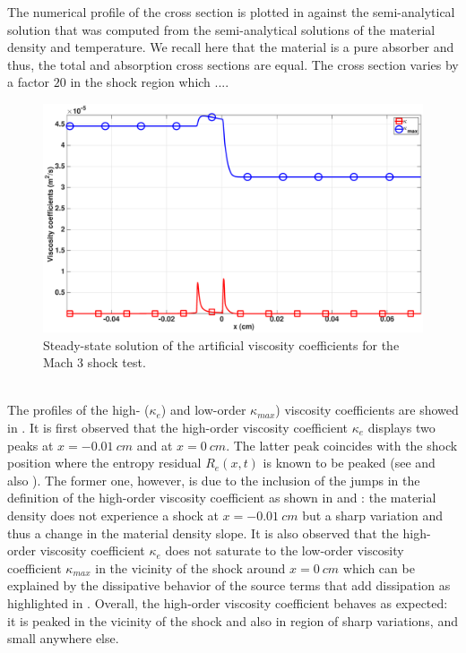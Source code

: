 \documentclass[times]{fldauth}
\begin{document}
The numerical profile of the cross section is plotted in  against the semi-analytical solution that was computed from the semi-analytical solutions of the material density and temperature. We recall here that the material is a pure absorber and thus, the total and absorption cross sections are equal. The cross section varies by a factor $20$ in the shock region which ....
%
\begin{figure}[H]
    \centering
    \includegraphics[width=\textwidth]{figures/dpt-xs/mach_3_nel_1000_viscosity.eps}
    \caption{Steady-state solution of the artificial viscosity coefficients for the Mach 3 shock test.}\label{fig:mach-3-dpt-xs-visc}
\end{figure}
%
 \\ 
The profiles of the high- ($\kappa_e$) and low-order $\kappa_{max}$) viscosity coefficients are showed in . It is first observed that the high-order viscosity coefficient $\kappa_e$ displays two peaks at $x=-0.01 \ cm$ and at $x = 0 \ cm$. The latter peak coincides with the shock position where the entropy residual $R_e(x,t)$ is known to be peaked (see  and also \cite{our_jcp_radhy_paper}). The former one, however, is due to the inclusion of the jumps in the definition of the high-order viscosity coefficient as shown in  and : the material density does not experience a shock at $x=-0.01 \ cm$ but a sharp variation and thus a change in the material density slope. It is also observed that the high-order viscosity coefficient $\kappa_e$ does not saturate to the low-order viscosity coefficient $\kappa_{max}$ in the vicinity of the shock around $x = 0 \ cm$ which can be explained by the dissipative behavior of the source terms that add dissipation as highlighted in . Overall, the high-order viscosity coefficient behaves as expected: it is peaked in the vicinity of the shock and also in region of sharp variations, and small anywhere else.
%
\end{document}
